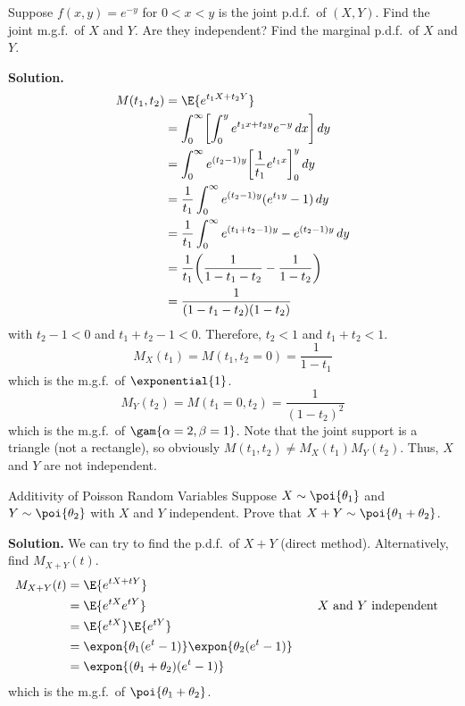 \begin{Example}{}{}
    Suppose $ f(x,y)=e^{-y} $ for $ 0<x<y $ is the joint p.d.f.\
    of $ (X,Y) $. Find the joint m.g.f.\ of $ X $ and $ Y $.
    Are they independent? Find the marginal p.d.f.\ of $ X $ and $ Y $.

    \textbf{Solution.}
    \begin{align*}
        M(t_1,t_2)
         & =\E{e^{t_1X+t_2Y}}                                                   \\
         & =\int_{0}^{\infty}
        \biggl[\int_{0}^{y} e^{t_1 x+ t_2 y}e^{-y}\, d{x} \biggr]\, d{y}        \\
         & =\int_{0}^{\infty} e^{(t_2-1)y}
        \biggl[ \frac{1}{t_1} e^{t_1 x} \biggr]_0^y \, d{y}                     \\
         & =\frac{1}{t_1} \int_{0}^{\infty} e^{(t_2-1)y}(e^{t_1 y}-1)\, d{y}    \\
         & =\frac{1}{t_1} \int_{0}^{\infty}
        e^{(t_1+t_2-1)y}-e^{(t_2-1)y}\, d{y}                                    \\
         & =\frac{1}{t_1} \biggl( \frac{1}{1-t_1-t_2} -\frac{1}{1-t_2}  \biggr) \\
         & =\frac{1}{(1-t_1-t_2)(1-t_2)}
    \end{align*}
    with $ t_2-1<0 $ and $ t_1+t_2-1<0 $. Therefore,
    $ t_2<1 $ and $ t_1+t_2<1 $.
    \[ M_X(t_1)=M(t_1,t_2=0)=\frac{1}{1-t_1} \]
    which is the m.g.f.\ of $ \exponential{1} $.
    \[ M_Y(t_2)=M(t_1=0,t_2)=\frac{1}{(1-t_2)^2} \]
    which is the m.g.f.\ of $ \gam{\alpha=2,\beta=1} $.
    Note that the joint support is a triangle (not a rectangle),
    so obviously $ M(t_1,t_2)\neq M_X(t_1)M_Y(t_2) $. Thus,
    $ X $ and $ Y $ are not independent.
\end{Example}
\begin{Example}{Additivity of Poisson Random Variables}{}
    Suppose $ X \sim \poi{\theta_1} $ and $ Y \sim \poi{\theta_2} $
    with $ X $ and $ Y $ independent. Prove
    that $ X+Y \sim \poi{\theta_1+\theta_2} $.

    \textbf{Solution.} We can try to find the p.d.f.\ of $ X+Y $
    (direct method). Alternatively, find $ M_{X+Y}(t) $.
    \begin{align*}
        M_{X+Y}(t)
         & =\E{e^{tX+tY}}                                                                           \\
         & =\E{e^{tX}e^{tY}}                               & \quad & \text{$X$ and $Y$ independent} \\
         & =\E{e^{tX}}\E{e^{tY}}                                                                    \\
         & =\expon{\theta_1(e^t-1)}\expon{\theta_2(e^t-1)}                                          \\
         & =\expon{(\theta_1+\theta_2)(e^t-1)}
    \end{align*}
    which is the m.g.f.\ of $ \poi{\theta_1+\theta_2} $.
\end{Example}
